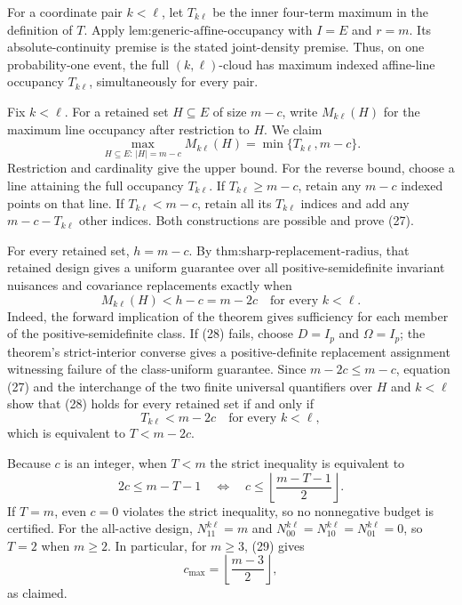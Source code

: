 For a coordinate pair \(k<\ell\), let \(T_{k\ell}\) be the inner four-term maximum in the definition of \(T\).  Apply \(\text{lem:generic-affine-occupancy}\) with \(I=E\) and \(r=m\).  Its absolute-continuity premise is the stated joint-density premise.  Thus, on one probability-one event, the full \((k,\ell)\)-cloud has maximum indexed affine-line occupancy \(T_{k\ell}\), simultaneously for every pair.

Fix \(k<\ell\).  For a retained set \(H\subseteq E\) of size \(m-c\), write \(M_{k\ell}(H)\) for the maximum line occupancy after restriction to \(H\).  We claim
\[
 \max_{H\subseteq E:\,|H|=m-c}M_{k\ell}(H)
 =\min\{T_{k\ell},m-c\}. \tag{27}
\]
Restriction and cardinality give the upper bound.  For the reverse bound, choose a line attaining the full occupancy \(T_{k\ell}\).  If \(T_{k\ell}\ge m-c\), retain any \(m-c\) indexed points on that line.  If \(T_{k\ell}<m-c\), retain all its \(T_{k\ell}\) indices and add any \(m-c-T_{k\ell}\) other indices.  Both constructions are possible and prove (27).

For every retained set, \(h=m-c\).  By \(\text{thm:sharp-replacement-radius}\), that retained design gives a uniform guarantee over all positive-semidefinite invariant nuisances and covariance replacements exactly when
\[
 M_{k\ell}(H)<h-c=m-2c
 \quad\text{for every }k<\ell. \tag{28}
\]
Indeed, the forward implication of the theorem gives sufficiency for each member of the positive-semidefinite class.  If (28) fails, choose \(D=I_p\) and \(\Omega=I_p\); the theorem's strict-interior converse gives a positive-definite replacement assignment witnessing failure of the class-uniform guarantee.  Since \(m-2c\le m-c\), equation (27) and the interchange of the two finite universal quantifiers over \(H\) and \(k<\ell\) show that (28) holds for every retained set if and only if
\[
 T_{k\ell}<m-2c\quad\text{for every }k<\ell,
\]
which is equivalent to \(T<m-2c\).

Because \(c\) is an integer, when \(T<m\) the strict inequality is equivalent to
\[
 2c\le m-T-1
 \quad\Longleftrightarrow\quad
 c\le\left\lfloor\frac{m-T-1}{2}\right\rfloor. \tag{29}
\]
If \(T=m\), even \(c=0\) violates the strict inequality, so no nonnegative budget is certified.  For the all-active design, \(N_{11}^{k\ell}=m\) and \(N_{00}^{k\ell}=N_{10}^{k\ell}=N_{01}^{k\ell}=0\), so \(T=2\) when \(m\ge2\).  In particular, for \(m\ge3\), (29) gives
\[
 c_{\max}=\left\lfloor\frac{m-3}{2}\right\rfloor,
\]
as claimed.